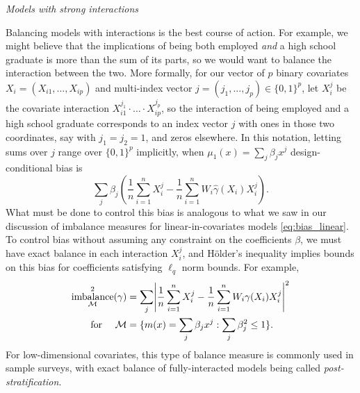 \documentclass{article}
\newcommand{\subsubsection}[1]{\par\noindent\textit{#1}\enspace}
\DeclarePairedDelimiter\abs{\lvert}{\rvert}
\DeclarePairedDelimiter\set{\{}{\}}
\theoremstyle{definition}
\DeclareMathOperator{\imbalance}{imbalance}
\newcommand{\hgamma}{\ensuremath{\hat\gamma}}
\newcommand{\model}{\mathcal{M}}
\newcommand{\<}{\langle}
\renewcommand{\>}{\rangle}
\newcommand\cmnt[2]{\;
{\textcolor{red}{[{\em #1 --- #2}] \;}
}}
\newcommand\avi[1]{\cmnt{#1}{Avi}}
\begin{document}
\subsubsection{Models with strong interactions}
\label{sec_balancing_all}

Balancing models with interactions is the best course of action.
For example, we might believe that the implications of being both employed \emph{and} a high school graduate is more than the sum of its parts, so we would want to balance the interaction between the two.
More formally, for our vector of $p$ binary covariates $X_{i} = (X_{i1}, \ldots, X_{ip})$ and multi-index vector $j = (j_1, ..., j_p) \in \{0,1\}^p$,
let $X_{i}^{j}$ be the covariate interaction $X_{i1}^{j_1} \cdot \ldots \cdot X_{ip}^{j_p}$, so the interaction of being employed and a high school graduate
corresponds to an index vector $j$ with ones in those two coordinates, say with $j_1=j_2=1$, and zeros elsewhere.  In this notation, letting sums over $j$ range over $\{0,1\}^p$ implicitly, when $\mu_1(x)=\sum_j \beta_j x^j$ design-conditional bias is
\begin{equation}
  \label{eq:bias_interactions}
  \sum_j \beta_j \left(\frac{1}{n}\sum_{i=1}^n X_i^j - \frac{1}{n}\sum_{i=1}^n W_i\hgamma(X_i) X_i^j\right).
\end{equation}
What must be done to control this bias is analogous to what we saw in our discussion of imbalance measures for linear-in-covariates models \eqref{eq:bias_linear}. To control bias without assuming any constraint on the coefficients $\beta$, we must have exact balance in each interaction $X_i^j$,
and H\"older's inequality implies bounds on this bias for coefficients satisfying $\ell_q$ norm bounds. For example,
\begin{equation}
    \label{eq:imbalance_interact}
    \begin{aligned}
   \imbalance_{\model}^2(\gamma) &=  \sum_{j} \abs*{
   \frac{1}{n} \sum_{i=1}^n X_{i}^{j} - \frac{1}{n}\sum_{i=1}^n W_i \gamma(X_i) X_{i}^{j}
   }^2 \\
   \quad \text{ for } \quad \model &= \set{ m(x) = \sum_{j} \beta_j x^j : \sum_{j} \beta_j^2 \le 1}.
   \end{aligned}
\end{equation}
For low-dimensional covariates, this type of balance measure is commonly used in sample surveys, with exact balance of fully-interacted models being called \emph{post-stratification}.
\end{document}
